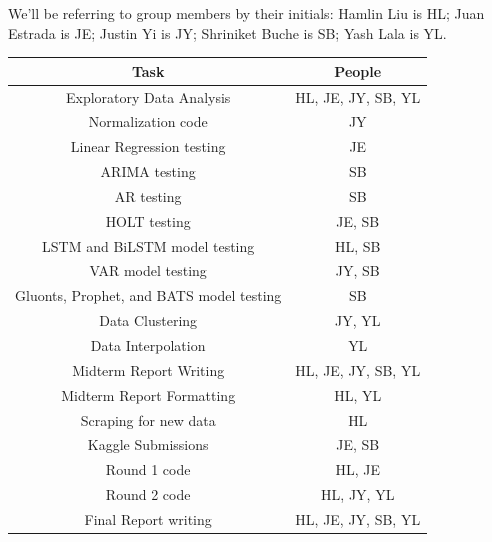 \documentclass[sigconf,nonacm]{acmart}
\begin{document}
We'll be referring to group members by their initials: Hamlin Liu is HL; Juan
Estrada is JE; Justin Yi is JY; Shriniket Buche is SB; Yash Lala is YL. 

\begin{table}[h!]
    \centering
    \begin{tabular}{|c|c|}
        \hline
         Task & People  \\
         \hline \hline
         Exploratory Data Analysis & HL, JE, JY, SB, YL \\
         \hline
         Normalization code & JY \\
         \hline
         Linear Regression testing & JE \\
         \hline
         ARIMA testing & SB \\
         \hline
         AR testing & SB \\
         \hline
         HOLT testing & JE, SB \\
         \hline
         LSTM and BiLSTM model testing & HL, SB  \\
         \hline
         VAR model testing & JY, SB \\
         \hline
         Gluonts, Prophet, and BATS model testing & SB \\
         \hline
         Data Clustering & JY, YL \\
         \hline
         Data Interpolation & YL \\
         \hline
         Midterm Report Writing & HL, JE, JY, SB, YL \\
         \hline
         Midterm Report Formatting & HL, YL \\
         \hline
         Scraping for new data & HL \\
         \hline
         Kaggle Submissions & JE, SB \\
         \hline
         Round 1 code & HL, JE \\
         \hline
         Round 2 code & HL, JY, YL \\
         \hline
         Final Report writing & HL, JE, JY, SB, YL \\
         \hline
    \end{tabular}
\end{table}




\end{document}
